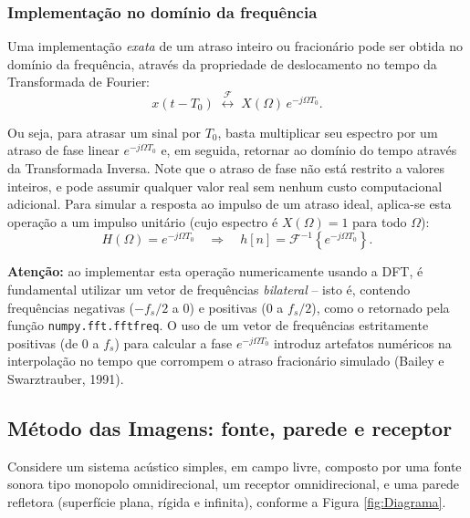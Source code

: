 \documentclass[a4paper,twoside,12pt]{article}
\begin{document}
	\subsubsection{Implementação no domínio da frequência}
	\label{sec:freq}
	
	Uma implementação \emph{exata} de um atraso inteiro ou fracionário pode ser obtida no domínio da frequência, através da propriedade de deslocamento no tempo da Transformada de Fourier:
	\begin{equation}
		x(t - T_0) \; \overset{\mathcal{F}}{\longleftrightarrow} \; X(\Omega) \, e^{-j \Omega T_0}.
	\end{equation}
	
	Ou seja, para atrasar um sinal por $T_0$, basta multiplicar seu espectro por um atraso de fase linear $e^{-j \Omega T_0}$ e, em seguida, retornar ao domínio do tempo através da Transformada Inversa. Note que o atraso de fase não está restrito a valores inteiros, e pode assumir qualquer valor real sem nenhum custo computacional adicional. Para simular a resposta ao impulso de um atraso ideal, aplica-se esta operação a um impulso unitário (cujo espectro é $X(\Omega)=1$ para todo $\Omega$):
	\begin{equation}
		H(\Omega) = e^{-j \Omega T_0} \quad \Longrightarrow \quad h[n] = \mathcal{F}^{-1}\left\{ e^{-j \Omega T_0} \right\}.
	\end{equation}
	
	\noindent \textbf{Atenção:} ao implementar esta operação numericamente usando a DFT, é fundamental utilizar um vetor de frequências \emph{bilateral} -- isto é, contendo frequências negativas ($-f_s/2$ a $0$) e positivas ($0$ a $f_s/2$), como o retornado pela função \texttt{numpy.fft.fftfreq}. O uso de um vetor de frequências estritamente positivas (de $0$ a $f_s$) para calcular a fase $e^{-j\Omega T_0}$ introduz artefatos numéricos na interpolação no tempo que corrompem o atraso fracionário simulado (Bailey e Swarztrauber, 1991).
	
	
	\subsection{Método das Imagens: fonte, parede e receptor}
	\label{sec:imagens}
	
	Considere um sistema acústico simples, em campo livre, composto por uma fonte sonora tipo monopolo omnidirecional, um receptor omnidirecional, e uma parede refletora (superfície plana, rígida e infinita), conforme a Figura \ref{fig:Diagrama}.
	
\end{document}
